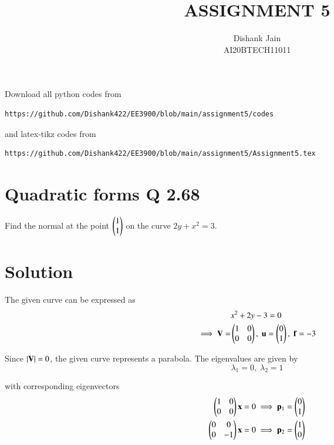 \documentclass[journal,12pt,twocolumn]{IEEEtran}
\begin{document}
     \def\centbox#1{\makebox[0in]{#1}}
     \def\topbox#1{\raisebox{-\baselineskip}[0in][0in]{#1}}
     \def\midbox#1{\raisebox{-0.5\baselineskip}[0in][0in]{#1}}
\vspace{3cm}
\title{ASSIGNMENT 5}
\author{Dishank Jain \\ AI20BTECH11011}
\maketitle
\newpage
\bigskip
\renewcommand{\thefigure}{\theenumi}
\renewcommand{\thetable}{\theenumi}
Download all python codes from
%
\begin{lstlisting}
https://github.com/Dishank422/EE3900/blob/main/assignment5/codes
\end{lstlisting}
% 
and latex-tikz codes from 
%
\begin{lstlisting}
https://github.com/Dishank422/EE3900/blob/main/assignment5/Assignment5.tex
\end{lstlisting}
%
\section{Quadratic forms Q 2.68}
Find the normal at the point $\begin{pmatrix}1\\1\end{pmatrix}$ on the curve $2y+x^2=3$.

\section{Solution}
The given curve can be expressed as 
\begin{align}
    &x^2+2y-3=0\\
    \implies \mathbf{V} = &\begin{pmatrix}1&0\\0&0\end{pmatrix},\; \mathbf{u} = \begin{pmatrix}0\\1\end{pmatrix},\; \mathbf{f} = -3
\end{align}

Since $\vert\mathbf{V}\vert = 0$, the given curve represents a parabola. The eigenvalues are given by 
\begin{equation}
    \lambda_1 = 0, \; \lambda_2 = 1
\end{equation}

with corresponding eigenvectors 
\begin{align}
    \begin{pmatrix}1&0\\0&0\end{pmatrix}\mathbf{x} = 0 \implies \mathbf{p}_1 = \begin{pmatrix}0\\1\end{pmatrix}\\
    \begin{pmatrix}0&0\\0&-1\end{pmatrix}\mathbf{x} = 0 \implies \mathbf{p}_2 = \begin{pmatrix}1\\0\end{pmatrix}
\end{align}
\end{document}
